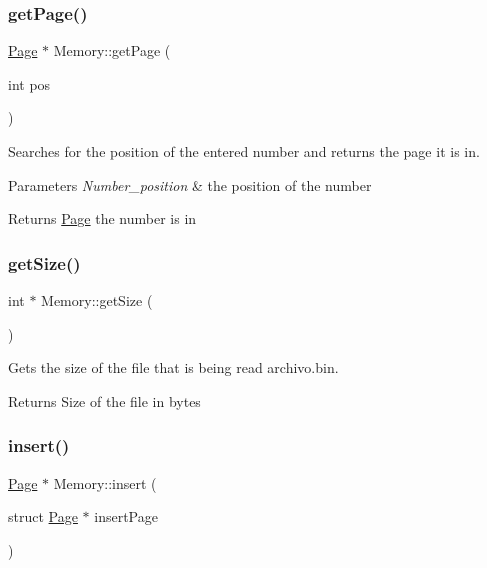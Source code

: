 \subsubsection{\texorpdfstring{get\+Page()}{getPage()}}
{\footnotesize\ttfamily \mbox{\hyperlink{structPage}{Page}} $\ast$ Memory\+::get\+Page (\begin{DoxyParamCaption}\item[{int}]{pos }\end{DoxyParamCaption})}



Searches for the position of the entered number and returns the page it is in. 


\begin{DoxyParams}{Parameters}
{\em Number\+\_\+position} & the position of the number \\
\hline
\end{DoxyParams}
\begin{DoxyReturn}{Returns}
\mbox{\hyperlink{structPage}{Page}} the number is in 
\end{DoxyReturn}
\mbox{\label{classMemory_a95daaddc99eb1a089ea3b9f2362b249c}} 
\subsubsection{\texorpdfstring{get\+Size()}{getSize()}}
{\footnotesize\ttfamily int $\ast$ Memory\+::get\+Size (\begin{DoxyParamCaption}{ }\end{DoxyParamCaption})}



Gets the size of the file that is being read archivo.\+bin. 

\begin{DoxyReturn}{Returns}
Size of the file in bytes 
\end{DoxyReturn}
\mbox{\label{classMemory_a93f9a283abd85a44a0c7a36c3b3c6167}} 
\subsubsection{\texorpdfstring{insert()}{insert()}}
{\footnotesize\ttfamily \mbox{\hyperlink{structPage}{Page}} $\ast$ Memory\+::insert (\begin{DoxyParamCaption}\item[{struct \mbox{\hyperlink{structPage}{Page}} $\ast$}]{insert\+Page }\end{DoxyParamCaption})}




